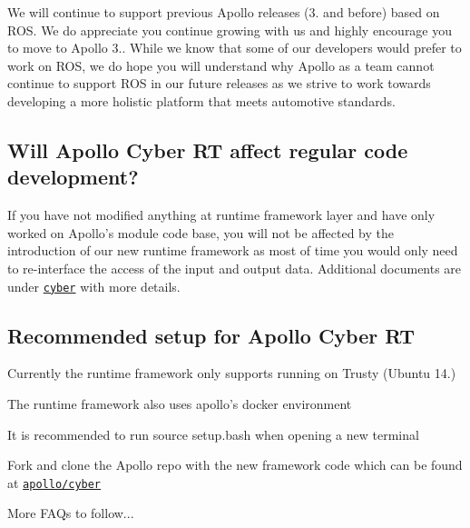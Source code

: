 We will continue to support previous Apollo releases (3. and before) based on R\-O\-S. We do appreciate you continue growing with us and highly encourage you to move to Apollo 3.. While we know that some of our developers would prefer to work on R\-O\-S, we do hope you will understand why Apollo as a team cannot continue to support R\-O\-S in our future releases as we strive to work towards developing a more holistic platform that meets automotive standards. 



\subsection*{Will Apollo Cyber R\-T affect regular code development?}

If you have not modified anything at runtime framework layer and have only worked on Apollo's module code base, you will not be affected by the introduction of our new runtime framework as most of time you would only need to re-\/interface the access of the input and output data. Additional documents are under \href{https://github.com/ApolloAuto/apollo/tree/master/docs/cyber/}{\tt cyber} with more details. 



\subsection*{Recommended setup for Apollo Cyber R\-T}


\begin{DoxyItemize}
\item Currently the runtime framework only supports running on Trusty (Ubuntu 14.)
\item The runtime framework also uses apollo's docker environment
\item It is recommended to run source setup.\-bash when opening a new terminal
\item Fork and clone the Apollo repo with the new framework code which can be found at \href{https://github.com/ApolloAuto/apollo/tree/master/cyber/}{\tt apollo/cyber} 

 More F\-A\-Qs to follow... 
\end{DoxyItemize}